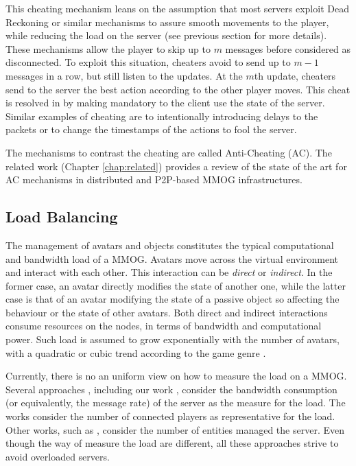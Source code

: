 \documentclass[final,10pt,a5paper]{phdimt}
\theoremstyle{definition}
\begin{document}
This cheating mechanism leans on the assumption that most servers exploit Dead Reckoning or similar mechanisms to assure smooth movements to the player, while reducing the load on the server (see previous section for more details).
These mechanisms allow the player to skip up to $m$ messages before considered as disconnected.
To exploit this situation, cheaters avoid to send up to $m-1$ messages in a row, but still listen to the updates. At the $m$th update, cheaters send to the server the best action according to the other player moves. This cheat is resolved in \cite{Cronin} by making mandatory to the client use the state of the server. Similar examples of cheating are to intentionally introducing delays to the packets or to change the timestamps of the actions to fool the server.


The mechanisms to contrast the cheating are called Anti-Cheating (AC).
The related work (Chapter \ref{chap:related}) provides a review of the state of the art for AC mechanisms in distributed and P2P-based MMOG infrastructures.








\subsection{Load Balancing}
\label{balancing}

The management of avatars and objects constitutes the typical computational and bandwidth load of a MMOG.
Avatars move across the virtual environment and interact with each other. This  interaction can be \textit{direct} or \textit{indirect}. In the former case, an avatar directly modifies the state of another one, while the latter case is that of an avatar modifying the state of a passive object so affecting the behaviour or the state of other avatars. Both direct and indirect interactions consume resources on the nodes, in terms of bandwidth and computational power. Such load is assumed to grow exponentially with the number of avatars, with a quadratic or cubic trend according to the game genre \cite{Nae2008}. 


Currently, there is no an uniform view on how to measure the load on a MMOG. 
Several approaches \cite{Lee2003,Rieche2008,Ahmed2008b}, including our work \cite{pos}, consider the bandwidth consumption (or equivalently, the message rate) of the server as the measure for the load. 
The works \cite{Lee,Chertov2006} consider the number of connected players as representative for the load.
Other works, such as \cite{Deng1995}, consider the number of entities managed the server. 
Even though the way of measure the load are different, all these approaches strive to avoid overloaded servers.
\end{document}
